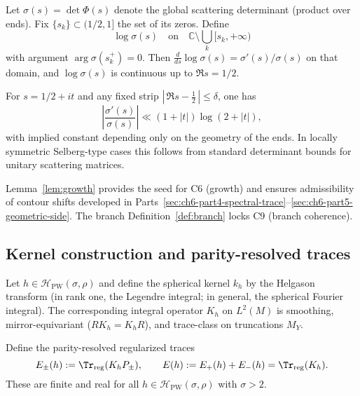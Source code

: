 \begin{definition}
\label{def:branch}
Let $\sigma(s)=\det\Phi(s)$ denote the global scattering determinant (product over ends). Fix $\{s_k\}\subset (1/2,1]$ the set of its zeros. Define
\[
\log \sigma(s)\quad\text{on}\quad \mathbb{C}\setminus \bigcup_k [s_k,+\infty)
\]
with argument $\arg \sigma(s_k^+)=0$. Then $\frac{d}{ds}\log\sigma(s)=\sigma'(s)/\sigma(s)$ on that domain, and $\log\sigma(s)$ is continuous up to $\Re s=1/2$. %
\end{definition}

\begin{lemma}
\label{lem:growth}
For $s=1/2+it$ and any fixed strip $|\,\Re s-\tfrac{1}{2}\,|\le \delta$, one has
\[
\left| \frac{\sigma'(s)}{\sigma(s)} \right| \ll (1+|t|)\log(2+|t|),
\]
with implied constant depending only on the geometry of the ends. In locally symmetric Selberg-type cases this follows from standard determinant bounds for unitary scattering matrices. %
\end{lemma}

\begin{remark}[C6–C9 seeds]
\label{rem:seed}
Lemma~\ref{lem:growth} provides the seed for C6 (growth) and ensures admissibility of contour shifts developed in Parts~\ref{sec:ch6-part4-spectral-trace}–\ref{sec:ch6-part5-geometric-side}. The branch Definition~\ref{def:branch} locks C9 (branch coherence). %
\end{remark}

\subsection{Kernel construction and parity-resolved traces}
\label{subsec:ch6-part1-kernel} \relax

\begin{definition}
\label{def:kernel}
Let $h\in\mathcal{H}_{\mathrm{PW}}(\sigma,\rho)$ and define the spherical kernel $k_h$ by the Helgason transform (in rank one, the Legendre integral; in general, the spherical Fourier integral). The corresponding integral operator $K_h$ on $L^2(M)$ is smoothing, mirror-equivariant ($RK_h=K_hR$), and trace-class on truncations $M_Y$. %
\end{definition}

\begin{definition}
\label{def:parity-traces}
Define the parity-resolved regularized traces
\[
E_\pm(h):=\Tr_{\mathrm{reg}}(K_h P_\pm),\qquad E(h):=E_+(h)+E_-(h)=\Tr_{\mathrm{reg}}(K_h).
\]
These are finite and real for all $h\in\mathcal{H}_{\mathrm{PW}}(\sigma,\rho)$ with $\sigma>2$. %
\end{definition}

